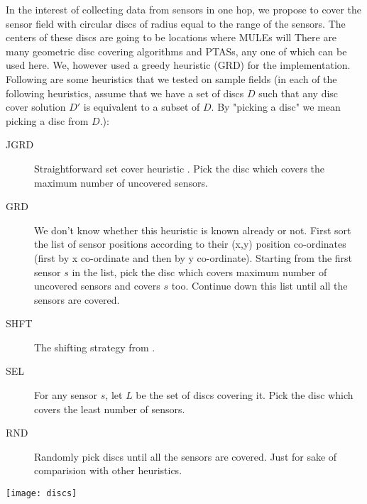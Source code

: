In the interest of collecting data from sensors in one hop, we propose to cover the sensor field with circular discs of radius equal to the range of the sensors. The centers of these discs are going to be locations where MULEs will 
There are many \cite{gmdc} \cite{dudc} \cite{shifting} geometric disc covering algorithms and PTASs, any one of which can be used here. We, however used a greedy heuristic (GRD) for the implementation. Following are some heuristics that we tested on sample fields (in each of the following heuristics, assume that we have a set of discs $D$ such that any disc cover solution $D'$ is equivalent to a subset of $D$. By "picking a disc" we mean picking a disc from $D$.):
\begin{description}
\item[JGRD] Straightforward set cover heuristic \cite{jgreedy}. Pick the disc which covers the maximum number of uncovered sensors.
\item[GRD] We don't know whether this heuristic is known already or not. First sort the list of sensor positions according to their (x,y) position co-ordinates (first by x co-ordinate and then by y co-ordinate). Starting from the first sensor $s$ in the list, pick the disc which covers maximum number of uncovered sensors and covers $s$ too. Continue down this list until all the sensors are covered.
\item[SHFT] The shifting strategy from \cite{shifting}.
\item[SEL] For any sensor $s$, let $L$ be the set of discs covering it. Pick the disc which covers the least number of sensors.
\item[RND] Randomly pick discs until all the sensors are covered. Just for sake of comparision with other heuristics.
\end{description}

\texttt{[image: discs]}